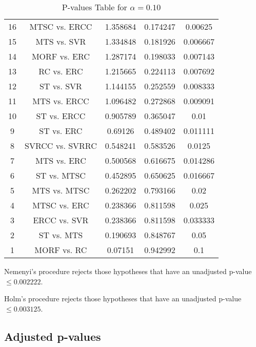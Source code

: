 \documentclass[a4paper,10pt]{article}
\begin{document}
\begin{landscape}
\begin{table}[!htp]
\begin{tabular}{ccccc}
16&MTSC vs. ERCC&1.358684&0.174247&0.00625\\
15&MTS vs. SVR&1.334848&0.181926&0.006667\\
14&MORF vs. ERC&1.287174&0.198033&0.007143\\
13&RC vs. ERC&1.215665&0.224113&0.007692\\
12&ST vs. SVR&1.144155&0.252559&0.008333\\
11&MTS vs. ERCC&1.096482&0.272868&0.009091\\
10&ST vs. ERCC&0.905789&0.365047&0.01\\
9&ST vs. ERC&0.69126&0.489402&0.011111\\
8&SVRCC vs. SVRRC&0.548241&0.583526&0.0125\\
7&MTS vs. ERC&0.500568&0.616675&0.014286\\
6&ST vs. MTSC&0.452895&0.650625&0.016667\\
5&MTS vs. MTSC&0.262202&0.793166&0.02\\
4&MTSC vs. ERC&0.238366&0.811598&0.025\\
3&ERCC vs. SVR&0.238366&0.811598&0.033333\\
2&ST vs. MTS&0.190693&0.848767&0.05\\
1&MORF vs. RC&0.07151&0.942992&0.1\\
\hline
\end{tabular}
\caption{P-values Table for $\alpha=0.10$}
\end{table}Nemenyi's procedure rejects those hypotheses that have an unadjusted p-value $\le0.002222$.

Holm's procedure rejects those hypotheses that have an unadjusted p-value $\le0.003125$.

\pagebreak

\subsection{Adjusted p-values}


\end{landscape}
\end{document}
